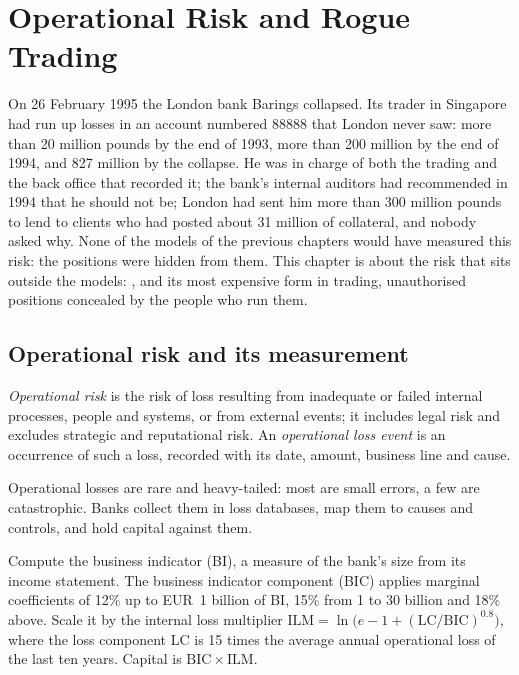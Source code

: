 \chapter{Operational Risk and Rogue Trading}\label{ch:rc:operational-risk-and-rogue-trading}

On 26 February 1995 the London bank Barings collapsed. Its trader in Singapore had run up losses in an account numbered 88888 that London never saw: more
than 20 million pounds by the end of 1993, more than 200 million by the end of 1994, and 827 million by
the collapse. He was in charge of both the trading and the back office that recorded it; the bank's
internal auditors had recommended in 1994 that he should not be; London had sent him more than 300
million pounds to lend to clients who had posted about 31 million of collateral, and nobody asked
why. None of the models of the previous chapters would have measured this risk: the positions were
hidden from them. This chapter is about the risk that sits outside the models: , and
its most expensive form in trading, unauthorised positions concealed by the people who run them.

\section{Operational risk and its measurement}

\begin{definition}\label{def:rc:operational-risk-and-rogue-trading:oprisk}
\emph{Operational risk} is the risk of loss resulting from inadequate or
failed internal processes, people and systems, or from external events; it includes legal risk and
excludes strategic and reputational risk. An \emph{operational loss event}
is an occurrence of such a loss, recorded with its date, amount, business line and cause.
\end{definition}

Operational losses are rare and heavy-tailed: most are small errors, a few are catastrophic. Banks
collect them in loss databases, map them to causes and controls, and hold capital against them.

\begin{method}\label{met:rc:operational-risk-and-rogue-trading:sa}
Compute the business indicator (BI), a measure of the bank's size from its income statement. The
business indicator component (BIC) applies marginal coefficients of 12\% up to EUR~1 billion of BI, 15\% from
1 to 30 billion and 18\% above. Scale it by the internal loss multiplier
$\mathrm{ILM} = \ln\bigl(e-1+(\mathrm{LC}/\mathrm{BIC})^{0.8}\bigr)$, where the loss component LC is 15 times the average annual
operational loss of the last ten years. Capital is $\mathrm{BIC}\times\mathrm{ILM}$.
\end{method}

